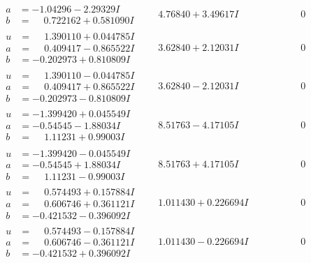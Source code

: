 \documentclass[1p]{elsarticle_modified}
\theoremstyle{definition}
\begin{document}
$$\begin{array}{c|c|c}
\begin{aligned}
a &= -1.04296 - 2.29329 I \\
b &= \phantom{-}0.722162 + 0.581090 I\end{aligned}
 & \phantom{-}4.76840 + 3.49617 I & \phantom{-0.000000 } 0 \\ \hline\begin{aligned}
u &= \phantom{-}1.390110 + 0.044785 I \\
a &= \phantom{-}0.409417 - 0.865522 I \\
b &= -0.202973 + 0.810809 I\end{aligned}
 & \phantom{-}3.62840 + 2.12031 I & \phantom{-0.000000 } 0 \\ \hline\begin{aligned}
u &= \phantom{-}1.390110 - 0.044785 I \\
a &= \phantom{-}0.409417 + 0.865522 I \\
b &= -0.202973 - 0.810809 I\end{aligned}
 & \phantom{-}3.62840 - 2.12031 I & \phantom{-0.000000 } 0 \\ \hline\begin{aligned}
u &= -1.399420 + 0.045549 I \\
a &= -0.54545 - 1.88034 I \\
b &= \phantom{-}1.11231 + 0.99003 I\end{aligned}
 & \phantom{-}8.51763 - 4.17105 I & \phantom{-0.000000 } 0 \\ \hline\begin{aligned}
u &= -1.399420 - 0.045549 I \\
a &= -0.54545 + 1.88034 I \\
b &= \phantom{-}1.11231 - 0.99003 I\end{aligned}
 & \phantom{-}8.51763 + 4.17105 I & \phantom{-0.000000 } 0 \\ \hline\begin{aligned}
u &= \phantom{-}0.574493 + 0.157884 I \\
a &= \phantom{-}0.606746 + 0.361121 I \\
b &= -0.421532 - 0.396092 I\end{aligned}
 & \phantom{-}1.011430 + 0.226694 I & \phantom{-0.000000 } 0 \\ \hline\begin{aligned}
u &= \phantom{-}0.574493 - 0.157884 I \\
a &= \phantom{-}0.606746 - 0.361121 I \\
b &= -0.421532 + 0.396092 I\end{aligned}
 & \phantom{-}1.011430 - 0.226694 I & \phantom{-0.000000 } 0 \\ \hline\begin{aligned}

\end{aligned}
\end{array}$$
\end{document}
